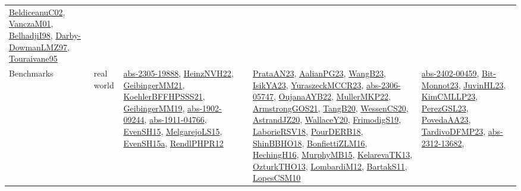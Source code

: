 {\begin{longtable}{llp{6cm}p{6cm}p{6cm}}
\href{papers/BeldiceanuC02.pdf}{BeldiceanuC02}\cite{BeldiceanuC02}, \href{papers/VanczaM01.pdf}{VanczaM01}\cite{VanczaM01}, \href{articles/BelhadjiI98.pdf}{BelhadjiI98}\cite{BelhadjiI98}, \href{articles/Darby-DowmanLMZ97.pdf}{Darby-DowmanLMZ97}\cite{Darby-DowmanLMZ97}, \href{papers/Touraivane95.pdf}{Touraivane95}\cite{Touraivane95}\\
Benchmarks & real world & \href{articles/abs-2305-19888.pdf}{abs-2305-19888}\cite{abs-2305-19888}, \href{articles/HeinzNVH22.pdf}{HeinzNVH22}\cite{HeinzNVH22}, \href{papers/GeibingerMM21.pdf}{GeibingerMM21}\cite{GeibingerMM21}, \href{articles/KoehlerBFFHPSSS21.pdf}{KoehlerBFFHPSSS21}\cite{KoehlerBFFHPSSS21}, \href{papers/GeibingerMM19.pdf}{GeibingerMM19}\cite{GeibingerMM19}, \href{articles/abs-1902-09244.pdf}{abs-1902-09244}\cite{abs-1902-09244}, \href{articles/abs-1911-04766.pdf}{abs-1911-04766}\cite{abs-1911-04766}, \href{papers/EvenSH15.pdf}{EvenSH15}\cite{EvenSH15}, \href{papers/MelgarejoLS15.pdf}{MelgarejoLS15}\cite{MelgarejoLS15}, \href{articles/EvenSH15a.pdf}{EvenSH15a}\cite{EvenSH15a}, \href{papers/RendlPHPR12.pdf}{RendlPHPR12}\cite{RendlPHPR12} & \href{articles/PrataAN23.pdf}{PrataAN23}\cite{PrataAN23}, \href{papers/AalianPG23.pdf}{AalianPG23}\cite{AalianPG23}, \href{papers/WangB23.pdf}{WangB23}\cite{WangB23}, \href{articles/IsikYA23.pdf}{IsikYA23}\cite{IsikYA23}, \href{articles/YuraszeckMCCR23.pdf}{YuraszeckMCCR23}\cite{YuraszeckMCCR23}, \href{articles/abs-2306-05747.pdf}{abs-2306-05747}\cite{abs-2306-05747}, \href{papers/OujanaAYB22.pdf}{OujanaAYB22}\cite{OujanaAYB22}, \href{articles/MullerMKP22.pdf}{MullerMKP22}\cite{MullerMKP22}, \href{papers/ArmstrongGOS21.pdf}{ArmstrongGOS21}\cite{ArmstrongGOS21}, \href{papers/TangB20.pdf}{TangB20}\cite{TangB20}, \href{papers/WessenCS20.pdf}{WessenCS20}\cite{WessenCS20}, \href{articles/AstrandJZ20.pdf}{AstrandJZ20}\cite{AstrandJZ20}, \href{articles/WallaceY20.pdf}{WallaceY20}\cite{WallaceY20}, \href{papers/FrimodigS19.pdf}{FrimodigS19}\cite{FrimodigS19}, \href{articles/LaborieRSV18.pdf}{LaborieRSV18}\cite{LaborieRSV18}, \href{articles/PourDERB18.pdf}{PourDERB18}\cite{PourDERB18}, \href{articles/ShinBBHO18.pdf}{ShinBBHO18}\cite{ShinBBHO18}, \href{papers/BonfiettiZLM16.pdf}{BonfiettiZLM16}\cite{BonfiettiZLM16}, \href{papers/HechingH16.pdf}{HechingH16}\cite{HechingH16}, \href{papers/MurphyMB15.pdf}{MurphyMB15}\cite{MurphyMB15}, \href{papers/KelarevaTK13.pdf}{KelarevaTK13}\cite{KelarevaTK13}, \href{articles/OzturkTHO13.pdf}{OzturkTHO13}\cite{OzturkTHO13}, \href{articles/LombardiM12.pdf}{LombardiM12}\cite{LombardiM12}, \href{articles/BartakS11.pdf}{BartakS11}\cite{BartakS11}, \href{articles/LopesCSM10.pdf}{LopesCSM10}\cite{LopesCSM10} & \href{articles/abs-2402-00459.pdf}{abs-2402-00459}\cite{abs-2402-00459}, \href{papers/Bit-Monnot23.pdf}{Bit-Monnot23}\cite{Bit-Monnot23}, \href{papers/JuvinHL23.pdf}{JuvinHL23}\cite{JuvinHL23}, \href{papers/KimCMLLP23.pdf}{KimCMLLP23}\cite{KimCMLLP23}, \href{papers/PerezGSL23.pdf}{PerezGSL23}\cite{PerezGSL23}, \href{papers/PovedaAA23.pdf}{PovedaAA23}\cite{PovedaAA23}, \href{papers/TardivoDFMP23.pdf}{TardivoDFMP23}\cite{TardivoDFMP23}, \href{articles/abs-2312-13682.pdf}{abs-2312-13682}\cite{abs-2312-13682}, 
\end{longtable}}

